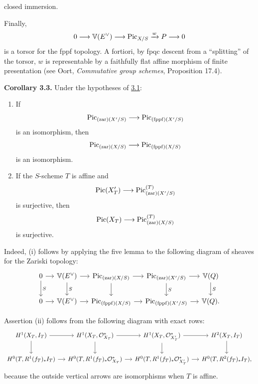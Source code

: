 closed immersion.

Finally,
\[
  0\longrightarrow\mathbb V(E^\vee)\longrightarrow\operatorname{Pic}_{X/S}
  \xrightarrow{w}P\longrightarrow0
\]
is a torsor for the fppf topology. A fortiori, by fpqc descent from a
``splitting'' of the torsor, $w$ is representable by a faithfully flat
affine morphism of finite presentation (see Oort, \emph{Commutative group
schemes}, Proposition 17.4).

\textbf{Corollary 3.3.} Under the hypotheses of \hyperlink{sga6.e12.prop.3-1}{3.1}:
\begin{enumerate}[label=\roman*)]
\item If
  \[
    \operatorname{Pic}_{(\mathrm{zar})(X'/S)}\longrightarrow
    \operatorname{Pic}_{(\mathrm{fppf})(X'/S)}
  \]
  is an isomorphism, then
  \[
    \operatorname{Pic}_{(\mathrm{zar})(X/S)}\longrightarrow
    \operatorname{Pic}_{(\mathrm{fppf})(X/S)}
  \]
  is an isomorphism.
\item If the $S$-scheme $T$ is affine and
  \[
    \operatorname{Pic}(X'_T)\longrightarrow\operatorname{Pic}_{(\mathrm{zar})(X'/S)}^{(T)}
  \]
  is surjective, then
  \[
    \operatorname{Pic}(X_T)\longrightarrow\operatorname{Pic}_{(\mathrm{zar})(X/S)}^{(T)}
  \]
  is surjective.
\end{enumerate}

Indeed, (i) follows by applying the five lemma to the following diagram of
sheaves for the Zariski topology:
\[
\begin{tikzcd}[column sep=small]
0 \arrow[r] \arrow[d,"S"] &
  \mathbb V(E^\vee) \arrow[r] \arrow[d,"S"] &
  \Pic_{(\mathrm{zar})(X/S)} \arrow[r] \arrow[d] &
  \Pic_{(\mathrm{zar})(X'/S)} \arrow[r] \arrow[d,"S"] &
  \mathbb V(Q) \arrow[d,"S"]\\
0 \arrow[r] & \mathbb V(E^\vee) \arrow[r] &
  \Pic_{(\mathrm{fppf})(X/S)} \arrow[r] &
  \Pic_{(\mathrm{fppf})(X'/S)} \arrow[r] & \mathbb V(Q).
\end{tikzcd}
\]

Assertion (ii) follows from the following diagram with exact rows:
\[
\begin{tikzcd}[column sep=small]
H^1(X_T,I_T) \arrow[r] \arrow[d] &
  H^1(X_T,\mathcal O_{X_T}^{*}) \arrow[r] \arrow[d] &
  H^1(X_T,\mathcal O_{X'_T}^{*}) \arrow[r] \arrow[d] &
  H^2(X_T,I_T) \arrow[d]\\
H^0(T,R^1(f_T)_*I_T) \arrow[r] &
  H^0(T,R^1(f_T)_*\mathcal O_{X_T}^{*}) \arrow[r] &
  H^0(T,R^1(f_T)_*\mathcal O_{X'_T}^{*}) \arrow[r] &
  H^0(T,R^2(f_T)_*I_T),
\end{tikzcd}
\]
because the outside vertical arrows are isomorphisms when $T$ is affine.

